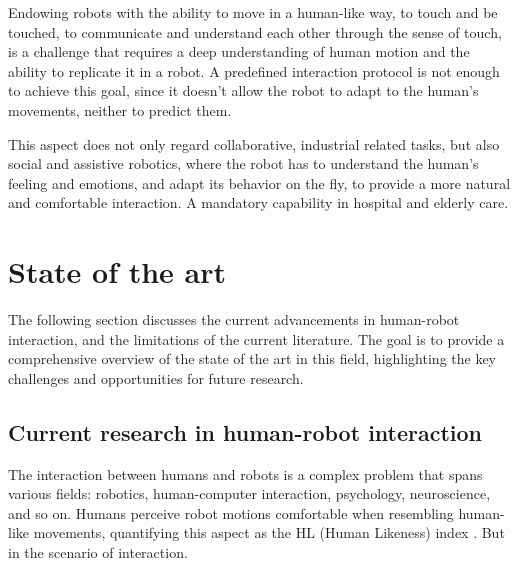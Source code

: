 \documentclass[12pt]{report}
\begin{document}
Endowing robots with the ability to move in a human-like way, to touch and be touched, to communicate and understand each other through the sense of touch, is a challenge that requires a deep understanding of human motion and the ability to replicate it in a robot. A predefined interaction protocol is not enough to achieve this goal, since it doesn't allow the robot to adapt to the human's movements, neither to predict them. 

This aspect does not only regard collaborative, industrial related tasks, but also social and assistive robotics, where the robot has to understand the human's feeling and emotions, and adapt its behavior on the fly, to provide a more natural and comfortable interaction. A mandatory capability in hospital and elderly care.

\chapter{State of the art}
The following section discusses the current advancements in human-robot interaction, and the limitations of the current literature. The goal is to provide a comprehensive overview of the state of the art in this field, highlighting the key challenges and opportunities for future research.  
\section{Current research in human-robot interaction}
The interaction between humans and robots is a complex problem that spans various fields: robotics, human-computer interaction, psychology, neuroscience, and so on. Humans perceive robot motions comfortable when resembling human-like movements, quantifying this aspect as the HL (Human Likeness) index \cite{coccaro}. But in the scenario of interaction.

\end{document}
